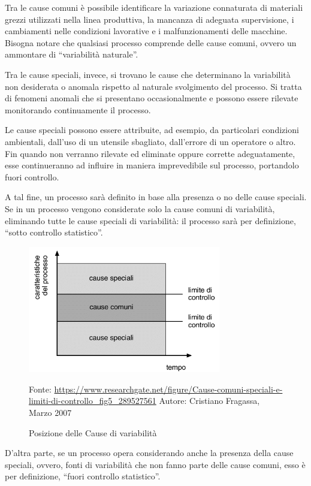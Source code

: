 Tra le cause comuni è possibile identificare la variazione connaturata di materiali grezzi utilizzati nella linea produttiva, la mancanza di adeguata supervisione, i cambiamenti nelle condizioni lavorative e i malfunzionamenti delle macchine.
Bisogna notare che qualsiasi processo comprende delle cause comuni, ovvero un ammontare di ``variabilità naturale''. 

Tra le cause speciali, invece, si trovano le cause che determinano la variabilità non desiderata o anomala rispetto al naturale svolgimento del processo. 
Si tratta di fenomeni anomali che si presentano occasionalmente e possono essere rilevate monitorando continuamente il processo. 
\cite{reconsultsrl}

Le cause speciali possono essere attribuite, ad esempio, da particolari condizioni ambientali, dall'uso di un utensile sbagliato, dall'errore di un operatore o altro. 
Fin quando non verranno rilevate ed eliminate oppure corrette adeguatamente, esse continueranno ad influire in maniera imprevedibile sul processo, portandolo fuori controllo.

A tal fine, un processo sarà definito in base alla presenza o no delle cause speciali. Se in un processo vengono considerate solo la cause comuni di variabilità, eliminando tutte le cause speciali di variabilità: il processo sarà per definizione, ``sotto controllo statistico''.
\cite{qualityi}


\begin{figure}[h]
  \centering
  \includegraphics[width=0.75\textwidth]{img/cause.png}
  \caption{Posizione delle Cause di variabilità} 
  {Fonte: \url{https://www.researchgate.net/figure/Cause-comuni-speciali-e-limiti-di-controllo_fig5_289527561}
  Autore: Cristiano Fragassa, Marzo 2007}
  \label{fig:cause.png}
\end{figure}

D'altra parte, se un processo opera considerando anche la presenza della cause speciali, ovvero, fonti di variabilità che non fanno parte delle cause comuni, esso è per definizione, ``fuori controllo statistico''.


